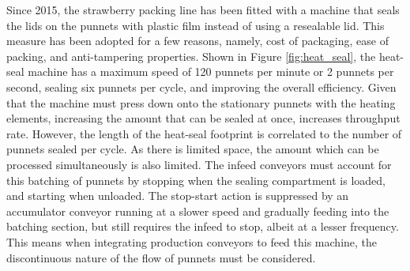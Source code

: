 \documentclass[fleqn,twoside,12pt]{report}
\begin{document}
Since 2015, the strawberry packing line has been fitted with a machine that seals the lids on the punnets with plastic film instead of using a resealable lid. This measure has been adopted for a few reasons, namely, cost of packaging, ease of packing, and anti-tampering properties. Shown in Figure \ref{fig:heat_seal}, the heat-seal machine has a maximum speed of 120 punnets per minute or 2 punnets per second, sealing six punnets per cycle, and improving the overall efficiency. Given that the machine must press down onto the stationary punnets with the heating elements, increasing the amount that can be sealed at once, increases throughput rate. However, the length of the heat-seal footprint is correlated to the number of punnets sealed per cycle. As there is limited space, the amount which can be processed simultaneously is also limited. The infeed conveyors must account for this batching of punnets by stopping when the sealing compartment is loaded, and starting when unloaded. The stop-start action is suppressed by an accumulator conveyor running at a slower speed and gradually feeding into the batching section, but still requires the infeed to stop, albeit at a lesser frequency. This means when integrating production conveyors to feed this machine, the discontinuous nature of the flow of punnets must be considered.
\end{document}
